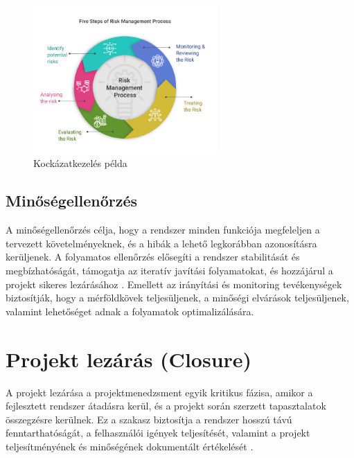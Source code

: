 \begin{figure}[H]
    \centering
    \includegraphics[width=70mm, keepaspectratio]{figures/risk.jpg}
    \caption{Kockázatkezelés példa}
    \label{fig:risk}
\end{figure}

\subsection{Minőségellenőrzés}

A minőségellenőrzés célja, hogy a rendszer minden funkciója megfeleljen a tervezett követelményeknek, 
és a hibák a lehető legkorábban azonosításra kerüljenek.
A folyamatos ellenőrzés elősegíti a rendszer stabilitását és megbízhatóságát, támogatja az iteratív 
javítási folyamatokat, és hozzájárul a projekt sikeres lezárásához \cite{Kovacs2016,Kaposi2019,Szalay2018}.
Emellett az irányítási és monitoring tevékenységek biztosítják, hogy a mérföldkövek teljesüljenek, 
a minőségi elvárások teljesüljenek, valamint lehetőséget adnak a folyamatok optimalizálására.

\section{Projekt lezárás (Closure)}

A projekt lezárása a projektmenedzsment egyik kritikus fázisa, amikor a fejlesztett rendszer átadásra kerül, 
és a projekt során szerzett tapasztalatok összegzésre kerülnek.  
Ez a szakasz biztosítja a rendszer hosszú távú fenntarthatóságát, a felhasználói igények teljesítését, valamint 
a projekt teljesítményének és minőségének dokumentált értékelését \cite{Hajdu2014,Szalay2018,Kovacs2016,Kaposi2019}.

